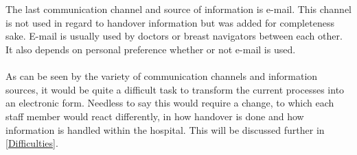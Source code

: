 \\ \\
The last communication channel and source of information is e-mail. This channel is not used in regard to handover information but was added for completeness sake. E-mail is usually used by doctors or breast navigators between each other. It also depends on personal preference whether or not e-mail is used. 
\\ \\
As can be seen by the variety of communication channels and information sources, it would be quite a difficult task to transform the current processes into an electronic form. Needless to say this would require a change, to which each staff member would react differently, in how handover is done and how information is handled within the hospital. This will be discussed further in \ref{Difficulties}.

